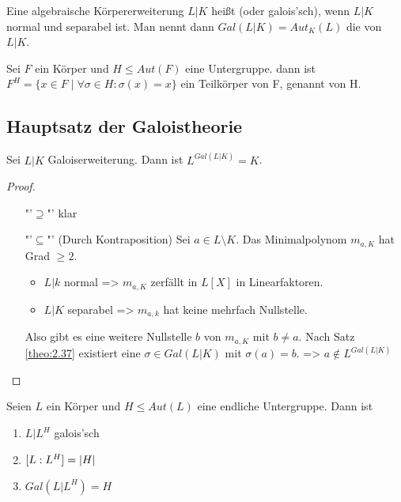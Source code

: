 \documentclass[../main.tex]{subfiles}
\begin{document}
\begin{definition}
    Eine algebraische Körpererweiterung $L|K$ heißt  (oder galois'sch), wenn $L|K$ normal und separabel ist.
    Man nennt dann $Gal(L|K) = Aut_K(L)$ die  von $L|K$.

    Sei $F$ ein Körper und $H\leq Aut(F)$ eine Untergruppe.
    dann ist $F^H = \{x\in F\mid \forall\sigma\in H:\sigma(x) = x\}$ ein Teilkörper von F, genannt  von H.
\end{definition}
\subsection{Hauptsatz der Galoistheorie}
\begin{lemma} \label{theo:3.2}
    Sei $L|K$ Galoiserweiterung. Dann ist $L^{Gal(L|K)} = K$.
\end{lemma}
\begin{proof}$ $
    \begin{enumerate}
        \item["'$\supseteq$"'] klar
        \item["'$\subseteq$"'] (Durch Kontraposition) Sei $a\in L\setminus K$. Das Minimalpolynom $m_{a,K}$ hat Grad $\geq2$.
        \begin{itemize}
            \item $L|k$ normal => $m_{a,K}$ zerfällt in $L[X]$ in Linearfaktoren.
            \item $L|K$ separabel => $m_{a,k}$ hat keine mehrfach Nullstelle.
        \end{itemize}
    
        Also gibt es eine weitere Nullstelle $b$ von $m_{a,K}$ mit $b\neq a$.
        Nach Satz \cref{theo:2.37} existiert eine $\sigma \in Gal(L|K)$ mit $\sigma(a)=b$.
        => $a\notin L^{Gal(L|K)}$
    \end{enumerate}
\end{proof}
\begin{theorem} \label{theo:3.3}
    Seien $L$ ein Körper und $H\leq Aut(L)$ eine endliche Untergruppe.
    Dann ist
    \begin{enumerate}
        \item $L|L^H$ galois'sch
        \item $[L:L^H] = \left\vert H \right\vert$
        \item $Gal(L|L^H) = H$
    \end{enumerate}
\end{theorem}
\end{document}
